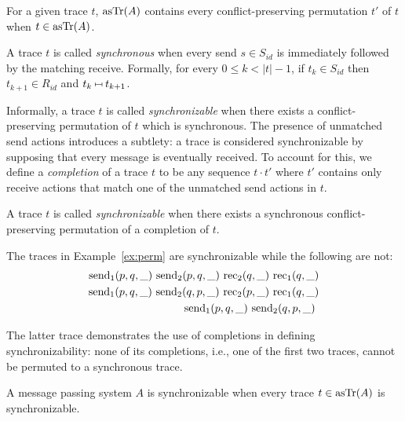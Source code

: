 \begin{lemma}
For a given trace $t$, $\mathrm{asTr}({A})$ contains every conflict-preserving permutation $t'$ of $t$ when $t\in \mathrm{asTr}({A})$.
\end{lemma}

A trace $t$ is called \emph{synchronous} when every send $s\in S_{id}$ is immediately followed by the matching receive. Formally, for every $0\leq k< |t| -1$, if $t_k\in S_{id}$ then $t_{k+1}\in R_{id}$ and $t_{k}\match t_{k+1}$.

Informally, a trace  $t$ is called \emph{synchronizable} when there exists a conflict-preserving permutation of $t$ which is synchronous.
The presence of unmatched send actions introduces a subtlety: a trace is considered synchronizable by supposing that every message is eventually received.
To account for this, we define a \emph{completion} of a trace $t$ to be any sequence $t\cdot t'$ where $t'$ contains only receive actions that match one of the unmatched send actions in $t$.

\begin{definition}
A trace $t$ is called \emph{synchronizable} when there exists a synchronous conflict-preserving permutation of a completion of $t$. 
\end{definition}

\begin{example}
The traces in Example~\ref{ex:perm} are synchronizable while the following are not:
\begin{align*}
\send{1}{p,q,\_}\ 
\send{2}{p,q,\_}\ 
\rec{2}{q,\_}\ 
\rec{1}{q,\_} \\
\send{1}{p,q,\_}\ 
\send{2}{q,p,\_}\ 
\rec{2}{p,\_}\ 
\rec{1}{q,\_} \\
\send{1}{p,q,\_}\ 
\send{2}{q,p,\_}\ 
\end{align*}

The latter trace demonstrates the use of completions in defining synchronizability: none of its completions, i.e., one of the first two traces, cannot be permuted to a synchronous trace.
\end{example}




A message passing system $A$ is synchronizable when every trace $t\in \mathrm{asTr}({A})$ is  synchronizable.


